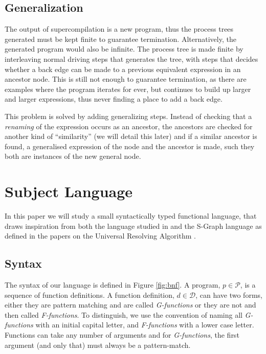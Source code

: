 \documentclass[10pt]{../sigplanconf}
\begin{document}
\subsection{Generalization}
The output of supercompilation is a new program, thus the process
trees generated must be kept finite to guarantee
termination. Alternatively, the generated program would also be
infinite. The process tree is made finite by interleaving normal
driving steps that generates the tree, with steps that decides whether
a back edge can be made to a previous equivalent expression in an
ancestor node. This is still not enough to guarantee termination, as
there are examples where the program iterates for ever, but continues
to build up larger and larger expressions, thus never finding a place
to add a back edge.

This problem is solved by adding generalizing steps. Instead of
checking that a \textit{renaming} of the expression occurs as an
ancestor, the ancestors are checked for another kind of ``similarity''
(we will detail this later) and if a similar ancestor is found, a
generalised expression of the node and the ancestor is made, such they
both are instances of the new general node.

\section{Subject Language}
\label{sec:trfl}
In this paper we will study a small syntactically typed functional
language, that draws inspiration from both the language studied in
\cite{sorensen1998introduction} and the S-Graph language as defined in
the papers on the Universal Resolving Algorithm
\cite{abramov2000universal, abramov2002universal,
  abramov2002principles}.

\subsection{Syntax}
The syntax of our language is defined in Figure \ref{fig:bnf}. A
program, $p \in \mathcal{P}$, is a sequence of function definitions. A
function definition, $d \in \mathcal{D}$, can have two forms, either
they are pattern matching and are called \textit{G-functions} or they
are not and then called \textit{F-functions}. To distinguish, we use
the convention of naming all \textit{G-functions} with an initial
capital letter, and \textit{F-functions} with a lower case
letter. Functions can take any number of arguments and for
\textit{G-functions}, the first argument (and only that) must always
be a pattern-match.
\end{document}
